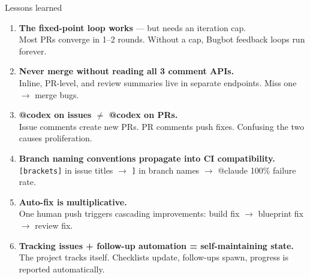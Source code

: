 \documentclass[aspectratio=169,10pt]{beamer}
\begin{document}
\begin{frame}{Lessons learned}
    \vspace{-0.2em}
    \begin{enumerate}
        \item \textcolor{leangreen}{\textbf{The fixed-point loop works}} --- but needs an iteration cap.\\
          {\scriptsize Most PRs converge in 1--2 rounds. Without a cap, Bugbot feedback loops run forever.}
        \item \textcolor{leangreen}{\textbf{Never merge without reading all 3 comment APIs.}}\\
          {\scriptsize Inline, PR-level, and review summaries live in separate endpoints. Miss one $\to$ merge bugs.}
        \item \textcolor{amber}{\textbf{@codex on issues $\neq$ @codex on PRs.}}\\
          {\scriptsize Issue comments create new PRs. PR comments push fixes. Confusing the two causes proliferation.}
        \item \textcolor{amber}{\textbf{Branch naming conventions propagate into CI compatibility.}}\\
          {\scriptsize \texttt{[brackets]} in issue titles $\to$ \texttt{]} in branch names $\to$ @claude 100\% failure rate.}
        \item \textcolor{leangreen}{\textbf{Auto-fix is multiplicative.}}\\
          {\scriptsize One human push triggers cascading improvements: build fix $\to$ blueprint fix $\to$ review fix.}
        \item \textcolor{leangreen}{\textbf{Tracking issues + follow-up automation = self-maintaining state.}}\\
          {\scriptsize The project tracks itself. Checklists update, follow-ups spawn, progress is reported automatically.}
    \end{enumerate}
\end{frame}
\end{document}
